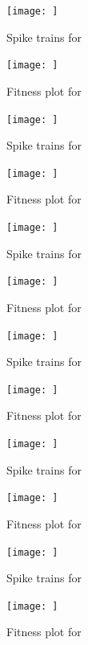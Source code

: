 \documentclass[a4paper]{article}
\begin{document}
\begin{figure}[htb!]
  \centering
  \texttt{[image: ]}
  \caption{Spike trains for}
\end{figure}

\begin{figure}[htb!]
  \centering
  \texttt{[image: ]}
  \caption{Fitness plot for}
\end{figure}

\begin{figure}[htb!]
  \centering
  \texttt{[image: ]}
  \caption{Spike trains for}
\end{figure}

\begin{figure}[htb!]
  \centering
  \texttt{[image: ]}
  \caption{Fitness plot for}
\end{figure}

\begin{figure}[htb!]
  \centering
  \texttt{[image: ]}
  \caption{Spike trains for}
\end{figure}

\begin{figure}[htb!]
  \centering
  \texttt{[image: ]}
  \caption{Fitness plot for}
\end{figure}

\begin{figure}[htb!]
  \centering
  \texttt{[image: ]}
  \caption{Spike trains for}
\end{figure}

\begin{figure}[htb!]
  \centering
  \texttt{[image: ]}
  \caption{Fitness plot for}
\end{figure}

\begin{figure}[htb!]
  \centering
  \texttt{[image: ]}
  \caption{Spike trains for}
\end{figure}

\begin{figure}[htb!]
  \centering
  \texttt{[image: ]}
  \caption{Fitness plot for}
\end{figure}

\begin{figure}[htb!]
  \centering
  \texttt{[image: ]}
  \caption{Spike trains for}
\end{figure}

\begin{figure}[htb!]
  \centering
  \texttt{[image: ]}
  \caption{Fitness plot for}
\end{figure}
\end{document}
